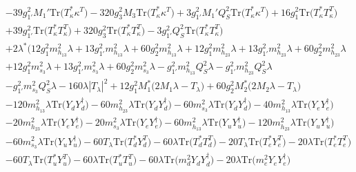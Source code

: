 {\begin{align}
 &-39 g_{1'}^{2} M_1' \mbox{Tr}\Big({T_{\kappa}^*  \kappa^{T}}\Big) -320 g_{3}^{2} M_3 \mbox{Tr}\Big({T_{\kappa}^*  \kappa^{T}}\Big) +3 g_{1'}^{2} M_1' Q_{S}^{2} \mbox{Tr}\Big({T_{\kappa}^*  \kappa^{T}}\Big) +16 g_{1}^{2} \mbox{Tr}\Big({T_{\kappa}^*  T_{\kappa}^{T}}\Big) \nonumber \\ 
 &+39 g_{1'}^{2} \mbox{Tr}\Big({T_{\kappa}^*  T_{\kappa}^{T}}\Big) +320 g_{3}^{2} \mbox{Tr}\Big({T_{\kappa}^*  T_{\kappa}^{T}}\Big) -3 g_{1'}^{2} Q_{S}^{2} \mbox{Tr}\Big({T_{\kappa}^*  T_{\kappa}^{T}}\Big) \nonumber \\ 
 &+2 \lambda^* \Big(12 g_{1}^{2} m_{h_{13}}^2 \lambda +13 g_{1'}^{2} m_{h_{13}}^2 \lambda +60 g_{2}^{2} m_{h_{13}}^2 \lambda +12 g_{1}^{2} m_{h_{23}}^2 \lambda +13 g_{1'}^{2} m_{h_{23}}^2 \lambda +60 g_{2}^{2} m_{h_{23}}^2 \lambda \nonumber \\ 
 &+12 g_{1}^{2} m_{s_3}^2 \lambda +13 g_{1'}^{2} m_{s_3}^2 \lambda +60 g_{2}^{2} m_{s_3}^2 \lambda - g_{1'}^{2} m_{h_{13}}^2 Q_{S}^{2} \lambda - g_{1'}^{2} m_{h_{23}}^2 Q_{S}^{2} \lambda \nonumber \\ 
 &- g_{1'}^{2} m_{s_3}^2 Q_{S}^{2} \lambda -160 \lambda |T_{\lambda}|^2 +12 g_{1}^{2} M_1^* \Big(2 M_1 \lambda  - T_{\lambda} \Big)+60 g_{2}^{2} M_2^* \Big(2 M_2 \lambda  - T_{\lambda} \Big)\nonumber \\ 
 &-120 m_{h_{13}}^2 \lambda \mbox{Tr}\Big({Y_d  Y_{d}^{\dagger}}\Big) -60 m_{h_{23}}^2 \lambda \mbox{Tr}\Big({Y_d  Y_{d}^{\dagger}}\Big) -60 m_{s_3}^2 \lambda \mbox{Tr}\Big({Y_d  Y_{d}^{\dagger}}\Big) -40 m_{h_{13}}^2 \lambda \mbox{Tr}\Big({Y_e  Y_{e}^{\dagger}}\Big) \nonumber \\ 
 &-20 m_{h_{23}}^2 \lambda \mbox{Tr}\Big({Y_e  Y_{e}^{\dagger}}\Big) -20 m_{s_3}^2 \lambda \mbox{Tr}\Big({Y_e  Y_{e}^{\dagger}}\Big) -60 m_{h_{13}}^2 \lambda \mbox{Tr}\Big({Y_u  Y_{u}^{\dagger}}\Big) -120 m_{h_{23}}^2 \lambda \mbox{Tr}\Big({Y_u  Y_{u}^{\dagger}}\Big) \nonumber \\ 
 &-60 m_{s_3}^2 \lambda \mbox{Tr}\Big({Y_u  Y_{u}^{\dagger}}\Big) -60 T_{\lambda} \mbox{Tr}\Big({T_d^*  Y_{d}^{T}}\Big) -60 \lambda \mbox{Tr}\Big({T_d^*  T_{d}^{T}}\Big) -20 T_{\lambda} \mbox{Tr}\Big({T_e^*  Y_{e}^{T}}\Big) -20 \lambda \mbox{Tr}\Big({T_e^*  T_{e}^{T}}\Big) \nonumber \\ 
 &-60 T_{\lambda} \mbox{Tr}\Big({T_u^*  Y_{u}^{T}}\Big) -60 \lambda \mbox{Tr}\Big({T_u^*  T_{u}^{T}}\Big) -60 \lambda \mbox{Tr}\Big({m_d^2  Y_d  Y_{d}^{\dagger}}\Big) -20 \lambda \mbox{Tr}\Big({m_e^2  Y_e  Y_{e}^{\dagger}}\Big) \nonumber \\ 

\end{align}}
